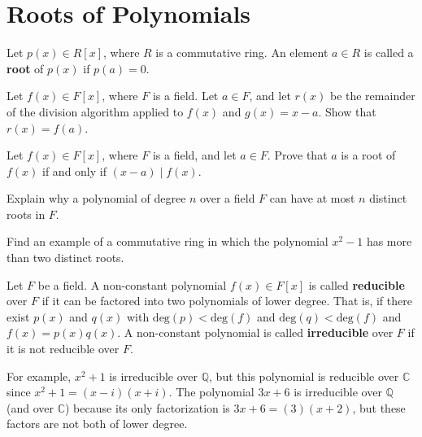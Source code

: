 \section{Roots of Polynomials}

\begin{definition}
Let \(p(x) \in R[x]\), where \(R\) is a commutative ring. An element \(a \in R\) is called a \textbf{root} of \(p(x)\) if \(p(a) = 0\).
\end{definition}

\begin{problem}
Let \(f(x) \in F[x] \), where \(F\) is a field. Let \(a \in F\), and let \(r(x)\) be the remainder of the division algorithm applied to \(f(x)\) and \(g(x) = x-a\). Show that \(r(x) = f(a)\).
\end{problem}

\begin{problem}
Let \(f(x) \in F[x] \), where \(F\) is a field, and let \(a\in F\). Prove that \(a\) is a root of \(f(x)\) if and only if \((x-a) \mid f(x) \).
\end{problem}

\begin{problem}
Explain why a polynomial of degree \(n\) over a field \(F\) can have at most \(n\) distinct roots in \(F\).
\end{problem}

\begin{problem}
Find an example of a commutative ring in which the polynomial $x^2-1$ has more than two distinct roots.
\end{problem}

\begin{definition}
Let \(F\) be a field. A non-constant polynomial \(f(x)\in F[x]\) is called \textbf{reducible} over \(F\) if it can be factored into two polynomials of lower degree. That is, if there exist \(p(x)\) and \(q(x)\) with \(\text{deg}(p)<\text{deg}(f)\) and \(\text{deg}(q)<\text{deg}(f)\) and \(f(x)=p(x)q(x)\). A non-constant polynomial is called \textbf{irreducible} over \(F\) if it is not reducible over \(F\).
\end{definition}

For example, \(x^2+1\) is irreducible over \(\mathbb{Q}\), but this polynomial is reducible over \(\mathbb{C}\) since \(x^2+1 = (x-i)(x+i)\). The polynomial \(3x+6\) is irreducible over \(\mathbb{Q}\) (and over \(\mathbb{C}\)) because its only factorization is \(3x+6 = (3)(x+2)\), but these factors are not both of lower degree.

